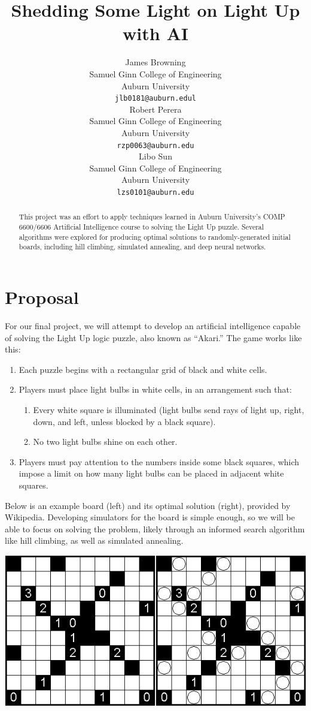 \documentclass{article} %
\title{Shedding Some Light on Light Up with AI}
\author{
James Browning \\
Samuel Ginn College of Engineering \\
Auburn University \\
\texttt{jlb0181@auburn.edul} \\
\And
Robert Perera \\
Samuel Ginn College of Engineering \\
Auburn University \\
\texttt{rzp0063@auburn.edu} \\
\And
Libo Sun \\
Samuel Ginn College of Engineering \\
Auburn University \\
\texttt{lzs0101@auburn.edu} \\
}
\begin{document}
\maketitle

\begin{abstract}
This project was an effort to apply techniques learned in Auburn University's COMP 6600/6606 Artificial Intelligence course to solving the Light Up puzzle. Several algorithms were explored for producing optimal solutions to randomly-generated initial boards, including hill climbing, simulated annealing, and deep neural networks.
\end{abstract}

\section{Proposal}

For our final project, we will attempt to develop an artificial intelligence capable of solving the Light Up logic puzzle, also known as “Akari.” The game works like this:

\begin{enumerate}
\item Each puzzle begins with a rectangular grid of black and white cells.
\item Players must place light bulbs in white cells, in an arrangement such that:
\begin{enumerate}
\item Every white square is illuminated (light bulbs send rays of light up, right, down, and left, unless blocked by a black square).
\item No two light bulbs shine on each other.
\end{enumerate}
\item Players must pay attention to the numbers inside some black squares, which impose a limit on how many light bulbs can be placed in adjacent white squares.
\end{enumerate}

Below is an example board (left) and its optimal solution (right), provided by Wikipedia. Developing simulators for the board is simple enough, so we will be able to focus on solving the problem, likely through an informed search algorithm like hill climbing, as well as simulated annealing.

\includegraphics[width=\textwidth]{Light Up}
\end{document}
